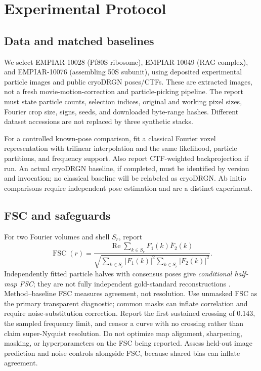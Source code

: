 \documentclass{article}
\begin{document}
\section{Experimental Protocol}
\subsection{Data and matched baselines}
We select EMPIAR-10028 (Pf80S ribosome), EMPIAR-10049 (RAG complex), and EMPIAR-10076 (assembling 50S subunit), using deposited experimental particle images and public cryoDRGN poses/CTFs. These are extracted images, not a fresh movie-motion-correction and particle-picking pipeline. The report must state particle counts, selection indices, original and working pixel sizes, Fourier crop size, signs, seeds, and downloaded byte-range hashes. Different dataset accessions are not replaced by three synthetic stacks.

For a controlled known-pose comparison, fit a classical Fourier voxel representation with trilinear interpolation and the same likelihood, particle partitions, and frequency support. Also report CTF-weighted backprojection if run. An actual cryoDRGN baseline, if completed, must be identified by version and invocation; no classical baseline will be relabeled as cryoDRGN. Ab initio comparisons require independent pose estimation and are a distinct experiment.

\subsection{FSC and safeguards}
For two Fourier volumes and shell $S_r$, report
\begin{equation}
\operatorname{FSC}(r)=\frac{\operatorname{Re}\sum_{k\in S_r}F_1(k)\bar F_2(k)}{\sqrt{\sum_{k\in S_r}|F_1(k)|^2\sum_{k\in S_r}|F_2(k)|^2}}.
\end{equation}
Independently fitted particle halves with consensus poses give \emph{conditional half-map FSC}; they are not fully independent gold-standard reconstructions \citep{schereschen2012,chen2013}. Method--baseline FSC measures agreement, not resolution. Use unmasked FSC as the primary transparent diagnostic; common masks can inflate correlation and require noise-substitution correction. Report the first sustained crossing of 0.143, the sampled frequency limit, and censor a curve with no crossing rather than claim super-Nyquist resolution. Do not optimize map alignment, sharpening, masking, or hyperparameters on the FSC being reported. Assess held-out image prediction and noise controls alongside FSC, because shared bias can inflate agreement.
\end{document}
